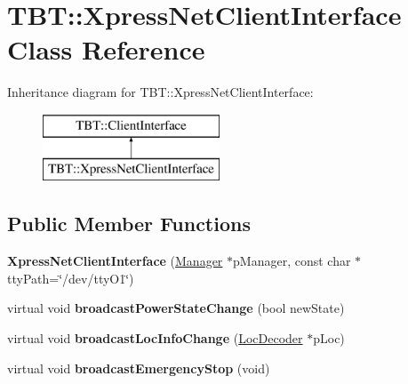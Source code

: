 \hypertarget{classTBT_1_1XpressNetClientInterface}{}\section{T\+BT\+:\+:Xpress\+Net\+Client\+Interface Class Reference}
\label{classTBT_1_1XpressNetClientInterface}
Inheritance diagram for T\+BT\+:\+:Xpress\+Net\+Client\+Interface\+:\begin{figure}[H]
\begin{center}
\leavevmode
\includegraphics[height=2.000000cm]{classTBT_1_1XpressNetClientInterface}
\end{center}
\end{figure}
\subsection*{Public Member Functions}
\begin{DoxyCompactItemize}
\item 
\mbox{\label{classTBT_1_1XpressNetClientInterface_afc3950ffc2b045e653c539a57967aa57}} 
{\bfseries Xpress\+Net\+Client\+Interface} (\hyperlink{classTBT_1_1Manager}{Manager} $\ast$p\+Manager, const char $\ast$tty\+Path=\char`\"{}/dev/tty\+O1\char`\"{})
\item 
\mbox{\label{classTBT_1_1XpressNetClientInterface_a338da1925ec68f197e87625c7497f472}} 
virtual void {\bfseries broadcast\+Power\+State\+Change} (bool new\+State)
\item 
\mbox{\label{classTBT_1_1XpressNetClientInterface_a8e64404cb84913c2d9290d2afb882b39}} 
virtual void {\bfseries broadcast\+Loc\+Info\+Change} (\hyperlink{classTBT_1_1LocDecoder}{Loc\+Decoder} $\ast$p\+Loc)
\item 
\mbox{\label{classTBT_1_1XpressNetClientInterface_a143641241f4830f22ec5beb78036ce4c}} 
virtual void {\bfseries broadcast\+Emergency\+Stop} (void)
\end{DoxyCompactItemize}
